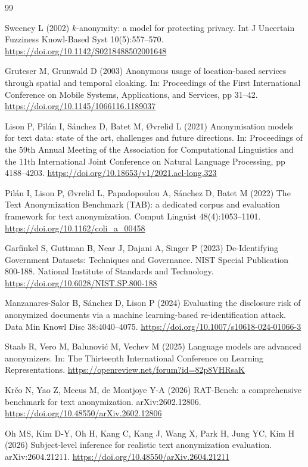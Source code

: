 \documentclass[pdflatex,sn-mathphys-num]{sn-jnl}
\theoremstyle{plain}
\begin{document}
\begin{thebibliography}{99}

Sweeney L (2002) $k$-anonymity: a model for protecting privacy. Int J Uncertain Fuzziness Knowl-Based Syst 10(5):557--570. \url{https://doi.org/10.1142/S0218488502001648}

Gruteser M, Grunwald D (2003) Anonymous usage of location-based services through spatial and temporal cloaking. In: Proceedings of the First International Conference on Mobile Systems, Applications, and Services, pp 31--42. \url{https://doi.org/10.1145/1066116.1189037}

Lison P, Pil\'{a}n I, S\'{a}nchez D, Batet M, \O vrelid L (2021) Anonymisation models for text data: state of the art, challenges and future directions. In: Proceedings of the 59th Annual Meeting of the Association for Computational Linguistics and the 11th International Joint Conference on Natural Language Processing, pp 4188--4203. \url{https://doi.org/10.18653/v1/2021.acl-long.323}

Pil\'{a}n I, Lison P, \O vrelid L, Papadopoulou A, S\'{a}nchez D, Batet M (2022) The Text Anonymization Benchmark (TAB): a dedicated corpus and evaluation framework for text anonymization. Comput Linguist 48(4):1053--1101. \url{https://doi.org/10.1162/coli\_a\_00458}

Garfinkel S, Guttman B, Near J, Dajani A, Singer P (2023) De-Identifying Government Datasets: Techniques and Governance. NIST Special Publication 800-188. National Institute of Standards and Technology. \url{https://doi.org/10.6028/NIST.SP.800-188}

Manzanares-Salor B, S\'{a}nchez D, Lison P (2024) Evaluating the disclosure risk of anonymized documents via a machine learning-based re-identification attack. Data Min Knowl Disc 38:4040--4075. \url{https://doi.org/10.1007/s10618-024-01066-3}

Staab R, Vero M, Balunovi\'{c} M, Vechev M (2025) Language models are advanced anonymizers. In: The Thirteenth International Conference on Learning Representations. \url{https://openreview.net/forum?id=82p8VHRsaK}

Kr\v{c}o N, Yao Z, Meeus M, de Montjoye Y-A (2026) RAT-Bench: a comprehensive benchmark for text anonymization. arXiv:2602.12806. \url{https://doi.org/10.48550/arXiv.2602.12806}

Oh MS, Kim D-Y, Oh H, Kang C, Kang J, Wang X, Park H, Jung YC, Kim H (2026) Subject-level inference for realistic text anonymization evaluation. arXiv:2604.21211. \url{https://doi.org/10.48550/arXiv.2604.21211}

\end{thebibliography}
\end{document}
